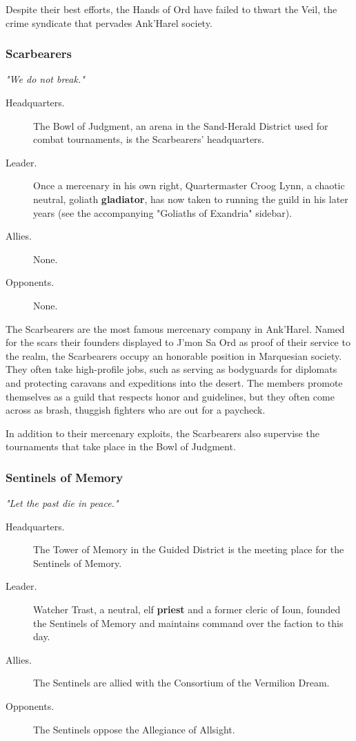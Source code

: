 \documentclass[10pt,a4paper,twoside,bg=print,twocolumn,openany,nodeprecatedcode]{dndbook}
\begin{document}
Despite their best efforts, the Hands of Ord have failed to thwart the Veil, the crime syndicate that pervades Ank'Harel society.

\subsubsection{Scarbearers}
\textit{"We do not break."}


\begin{description}
\item[Headquarters.]
The Bowl of Judgment, an arena in the Sand-Herald District used for combat tournaments, is the Scarbearers' headquarters.
\item[Leader.]
Once a mercenary in his own right, Quartermaster Croog Lynn, a chaotic neutral, goliath \textbf{gladiator}, has now taken to running the guild in his later years (see the accompanying "Goliaths of Exandria" sidebar).
\item[Allies.]
None.
\item[Opponents.]
None.
\end{description}

The Scarbearers are the most famous mercenary company in Ank'Harel. Named for the scars their founders displayed to J'mon Sa Ord as proof of their service to the realm, the Scarbearers occupy an honorable position in Marquesian society. They often take high-profile jobs, such as serving as bodyguards for diplomats and protecting caravans and expeditions into the desert. The members promote themselves as a guild that respects honor and guidelines, but they often come across as brash, thuggish fighters who are out for a paycheck.

In addition to their mercenary exploits, the Scarbearers also supervise the tournaments that take place in the Bowl of Judgment.

\subsubsection{Sentinels of Memory}
\textit{"Let the past die in peace."}


\begin{description}
\item[Headquarters.]
The Tower of Memory in the Guided District is the meeting place for the Sentinels of Memory.
\item[Leader.]
Watcher Trast, a neutral, elf \textbf{priest} and a former cleric of Ioun, founded the Sentinels of Memory and maintains command over the faction to this day.
\item[Allies.]
The Sentinels are allied with the Consortium of the Vermilion Dream.
\item[Opponents.]
The Sentinels oppose the Allegiance of Allsight.
\end{description}
\end{document}
